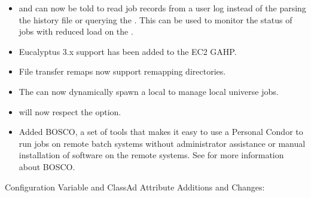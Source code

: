 \begin{itemize}
\item {} and  can now be told to read job records
from a user log instead of the parsing the history file or querying the
.  This can be used to monitor the status of jobs with
reduced load on the .

\item Eucalyptus 3.x support has been added to the EC2 GAHP.

\item File transfer remaps now support remapping directories.

\item The  can now dynamically spawn a local 
to manage local universe jobs.

\item {}  will now respect the  option.

\item Added BOSCO, a set of tools that makes it easy to use a Personal
Condor to run jobs on remote batch systems without administrator
assistance or manual installation of software on the remote systems.
See  for more
information about BOSCO.

\end{itemize}


\noindent Configuration Variable and ClassAd Attribute Additions and Changes:

